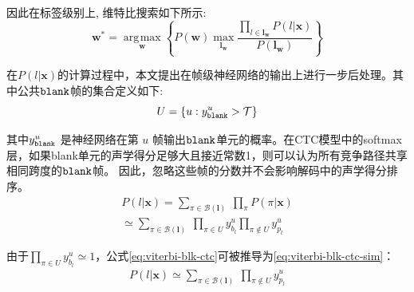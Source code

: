 因此在标签级别上, 维特比搜索如下所示:
\begin{equation} \label{eq:ctc-dec-lsd}
   \mathbf{w}^* = \mathop{\arg\!\max}\limits_\mathbf{w} \left\{
        P(\mathbf{w})
        \mathop{\max}\limits_{\mathbf{l}_\mathbf{w}} \frac{ \prod_{l\in\mathbf{l}_\mathbf{w}} P(l|\mathbf{x}) }{P(\mathbf{l}_\mathbf{w})}\right\}
     \end{equation}

在$P(l|\mathbf{x})$的计算过程中，本文提出在帧级神经网络的输出上进行一步后处理。其中公共$\tt blank$帧的集合定义如下:
  \begin{equation} \label{eq:com-blk-idx}
    U=\{u:y^{u}_{\tt{blank}} > \mathcal{T}\}
    \end{equation}


其中$y^{u}_{\tt{blank}}$ 是神经网络在第 $u$ 帧输出$\tt blank$单元的概率。在CTC模型中的softmax层，如果blank单元的声学得分足够大且接近常数1，则可以认为所有竞争路径共享相同跨度的$\tt blank$帧。 因此，忽略这些帧的分数并不会影响解码中的声学得分排序。
  \begin{equation} \label{eq:viterbi-blk-ctc}
  \begin{split}
      P(l|\mathbf{x})
      =\sum_{\pi\in\mathcal{B}(\mathbf{l})}
          \ \prod_{\pi}P(\pi|\mathbf{x})\\
        \simeq\sum_{\pi\in\mathcal{B}(\mathbf{l})}
         \  \prod_{\pi\in U}{y_{b_l}^u}{\prod_{\pi\not\in U}{y_{p_l}^u}}
        \end{split}
       \end{equation}


由于$\prod_{\pi\in U}{y_{b_l}^u}\simeq 1$，公式\ref{eq:viterbi-blk-ctc}可被推导为\ref{eq:viterbi-blk-ctc-sim}：
  \begin{equation} \label{eq:viterbi-blk-ctc-sim}
  \begin{split}
      P(l|\mathbf{x})
        \simeq\sum_{\pi\in\mathcal{B}(\mathbf{l})}
         \  {\prod_{\pi\not\in U}{y_{p_l}^u}}
        \end{split}
       \end{equation}

